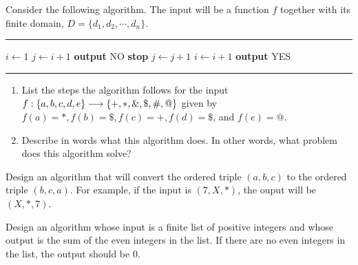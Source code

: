 \clearpage
\begin{exer}
Consider the following algorithm. The input will be a function $f$ together
with its finite domain, $D = \{d_1,d_2,\cdots,d_n\}$.
\begin{algrthm}
  \hrule\kern5pt\relax
  \begin{algorithmic}[1]
    \State $i \gets 1$
      \State $j \gets i+1$
          \State \textbf{output} \textsf{NO}
          \State \textbf{stop}
        \EndIf
        \State $j \gets j+1$
      \EndWhile
      \State $i \gets i+1$
    \EndWhile
    \State \textbf{output} \textsf{YES}
  \end{algorithmic}\label{alg:exer 17.3 words}
  \hrule\kern5pt\relax
\end{algrthm}

%
%
%
%
%
%
%

\begin{enumerate}[label=(\alph*)]
 \item List the steps the algorithm follows for the input $f: \{a,b,c,d,e\}\longrightarrow\{+,*,\&,\$,\#,@\}$
 given by $f(a)=*, f(b)= \$, f(c) = +, f(d) = \$$, and $f(e)= @$.
 
 \item Describe in words what this algorithm does. In other words,
 what problem does this algorithm solve?
\end{enumerate}

\end{exer}

\begin{exer}
Design an algorithm that will convert the ordered triple $(a,b,c)$ to the
ordered triple $(b,c,a)$. For example, if the input is $(7,X, *)$, the ouput
will be $(X,*,7)$.
\end{exer}

\begin{exer}
Design an algorithm whose input is a  finite  list of positive integers and whose output
is the sum of the even integers in the list. If there are no even integers in the list, the 
output should be $0$.
\end{exer}

